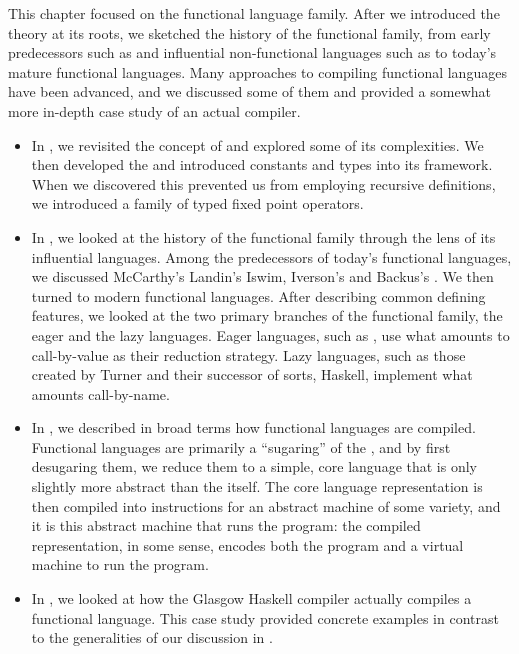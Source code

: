 \label{functional:conclusion}
This chapter focused on the functional language family. After we introduced the theory at its roots, we sketched the history of the functional family, from early predecessors such as  and influential non-functional languages such as  to today's mature functional languages. Many approaches to compiling functional languages have been advanced, and we discussed some of them and provided a somewhat more in-depth case study of an actual compiler.

\begin{itemize}
\item In , we revisited the concept of  and explored some of its complexities. We then developed the \lambdacalc and introduced constants and types into its framework. When we discovered this prevented us from employing recursive definitions, we introduced a family of typed fixed point operators.

\item In , we looked at the history of the functional family through the lens of its influential languages. Among the predecessors of today's functional languages, we discussed McCarthy's  Landin's Iswim, Iverson's  and Backus's . We then turned to modern functional languages. After describing common defining features, we looked at the two primary branches of the functional family, the eager and the lazy languages. Eager languages, such as , use what amounts to call-by-value as their reduction strategy. Lazy languages, such as those created by Turner and their successor of sorts, Haskell, implement what amounts call-by-name.

\item In , we described in broad terms how functional languages are compiled. Functional languages are primarily a ``sugaring'' of the \lambdacalc{}, and by first desugaring them, we reduce them to a simple, core language that is only slightly more abstract than the \lambdacalc itself.%
The core language representation is then compiled into instructions for an abstract machine of some variety, and it is this abstract machine that runs the program: the compiled representation, in some sense, encodes both the program and a virtual machine to run the program.

\item In , we looked at how the Glasgow Haskell compiler actually compiles a functional language. This case study provided concrete examples in contrast to the generalities of our discussion in .
\end{itemize}